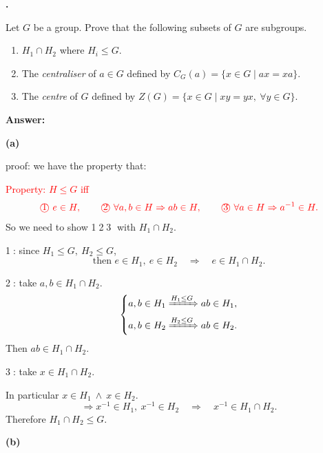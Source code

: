 \documentclass[11pt]{article}
\newcounter{ej}
\renewcommand{\theej}{\textbf{\arabic{ej}.}}
\newenvironment{ej}{
    \stepcounter{ej}
    \begin{list}{\theej}{
        \setlength{\itemindent}{0ex}
        \setlength{\labelwidth}{4ex}
        \setlength{\labelsep}{0.5ex}
        \setlength{\leftmargin}{4ex}
        \setlength{\listparindent}{0ex}
        \setlength{\topsep}{3mm plus 0.5mm minus 0.5mm}
        \setlength{\parsep}{0mm}
        \setlength{\itemsep}{1mm plus 0.3mm minus 0.3mm}
        \setlength{\rightmargin}{0ex}
    }
    \item
}{\end{list}}
\newenvironment{sol}{
    \def\FrameCommand##1{\fcolorbox{black}{gray!20}{##1}}%
    \MakeFramed{\advance\hsize-\width \FrameRestore}%
    \noindent\textbf{Answer:} \ignorespaces
}{\endMakeFramed}
\begin{document}
    \begin{ej}
        Let $G$ be a group. Prove that the following subsets of $G$ are
        subgroups.
        \begin{enumerate}
            \item $H_1\cap H_2$ where $H_i\le G$.
            \item The \emph{centraliser} of $a\in G$ defined by
                $C_G(a)=\{x\in G\mid ax=xa\}$.
            \item The \emph{centre} of $G$ defined by
                $Z(G)=\{x\in G\mid xy=yx,\ \forall y\in G\}$.
        \end{enumerate}

        \begin{sol}
            \textbf{(a)}

            proof: we have the property that:

            \textcolor{red}{Property: $H\le G$ iff}
            \[
                \textcolor{red}{\text{\textcircled{1}}\ e\in H,\qquad
                \text{\textcircled{2}}\ \forall a,b\in H\Rightarrow ab\in H,
                \qquad
                \text{\textcircled{3}}\ \forall a\in H\Rightarrow a^{-1}\in H.}
            \]
            So we need to show \textcircled{1}\textcircled{2}\textcircled{3}
            with $H_1\cap H_2$.

            \textcircled{1}: since $H_1\le G,\ H_2\le G$,
            \[
                \text{then }e\in H_1,\ e\in H_2
                \quad\Rightarrow\quad e\in H_1\cap H_2.
            \]

            \textcircled{2}: take $a,b\in H_1\cap H_2$.
            \[
                \left\{
                \begin{aligned}
                    a,b\in H_1&\xRightarrow{H_1\le G}ab\in H_1,\\
                    a,b\in H_2&\xRightarrow{H_2\le G}ab\in H_2.
                \end{aligned}
                \right.
            \]
            Then $ab\in H_1\cap H_2$.

            \textcircled{3}: take $x\in H_1\cap H_2$.

            In particular $x\in H_1\ \wedge\ x\in H_2$.
            \[
                \Rightarrow x^{-1}\in H_1,\ x^{-1}\in H_2
                \quad\Rightarrow\quad x^{-1}\in H_1\cap H_2.
            \]
            Therefore $H_1\cap H_2\le G$.

            \medskip
            \textbf{(b)}


\end{sol}
\end{ej}
\end{document}
